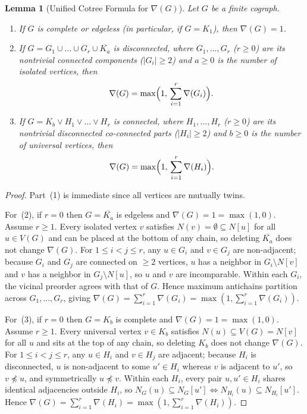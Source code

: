 \documentclass[11pt,a4paper]{article}
\newtheorem{lemma}[theorem]{Lemma}
\theoremstyle{definition}
\begin{document}
\begin{lemma}[Unified Cotree Formula for $\nabla(G)$]\label{lem:cotree_nabla}
  Let $G$ be a finite cograph.
  \begin{enumerate}
    \item If $G$ is complete or edgeless (in particular, if $G = K_1$), then $\nabla(G) = 1$.
    \item If $G = G_1 \cup \dots \cup G_r \cup \overline{K_a}$ is disconnected, where $G_1,\dots,G_r$ ($r \ge 0$) are its nontrivial connected components ($|G_i| \ge 2$) and $a \ge 0$ is the number of isolated vertices, then
    \[
      \nabla(G) = \max\Bigl(1,\, \sum_{i=1}^{r} \nabla(G_i)\Bigr).
    \]
    \item If $G = K_b \vee H_1 \vee \dots \vee H_r$ is connected, where $H_1,\dots,H_r$ ($r \ge 0$) are its nontrivial disconnected co-connected parts ($|H_i| \ge 2$) and $b \ge 0$ is the number of universal vertices, then
    \[
      \nabla(G) = \max\Bigl(1,\, \sum_{i=1}^{r} \nabla(H_i)\Bigr).
    \]
  \end{enumerate}
\end{lemma}

\begin{proof}
  Part~(1) is immediate since all vertices are mutually twins.

  For~(2), if $r = 0$ then $G = \overline{K_a}$ is edgeless and $\nabla(G) = 1 = \max(1, 0)$. Assume $r \ge 1$. Every isolated vertex $v$ satisfies $N(v) = \emptyset \subseteq N[u]$ for all $u \in V(G)$ and can be placed at the bottom of any chain, so deleting $\overline{K_a}$ does not change $\nabla(G)$. For $1 \le i < j \le r$, any $u \in G_i$ and $v \in G_j$ are non-adjacent; because $G_i$ and $G_j$ are connected on $\ge 2$ vertices, $u$ has a neighbor in $G_i \setminus N[v]$ and $v$ has a neighbor in $G_j \setminus N[u]$, so $u$ and $v$ are incomparable. Within each $G_i$, the vicinal preorder agrees with that of $G$. Hence maximum antichains partition across $G_1,\dots,G_r$, giving $\nabla(G) = \sum_{i=1}^r \nabla(G_i) = \max(1, \sum_{i=1}^r \nabla(G_i))$.

  For~(3), if $r = 0$ then $G = K_b$ is complete and $\nabla(G) = 1 = \max(1, 0)$. Assume $r \ge 1$. Every universal vertex $v \in K_b$ satisfies $N(u) \subseteq V(G) = N[v]$ for all $u$ and sits at the top of any chain, so deleting $K_b$ does not change $\nabla(G)$. For $1 \le i < j \le r$, any $u \in H_i$ and $v \in H_j$ are adjacent; because $H_i$ is disconnected, $u$ is non-adjacent to some $u' \in H_i$ whereas $v$ is adjacent to $u'$, so $v \not\preceq u$, and symmetrically $u \not\preceq v$. Within each $H_i$, every pair $u, u' \in H_i$ shares identical adjacencies outside $H_i$, so $N_G(u) \subseteq N_G[u'] \iff N_{H_i}(u) \subseteq N_{H_i}[u']$. Hence $\nabla(G) = \sum_{i=1}^r \nabla(H_i) = \max(1, \sum_{i=1}^r \nabla(H_i))$.
\end{proof}
\end{document}
